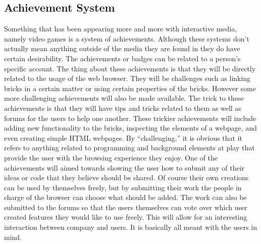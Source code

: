 \documentclass[11pt]{article}
\begin{document}
\subsection{Achievement System}
Something that has been appearing more and more with interactive media, namely video games is a system of achievements. Although these systems don’t actually mean anything outside of the media they are found in they do have certain desirability. The achievements or badges can be related to a person’s specific account. The thing about these achievements is that they will be directly related to the usage of the web browser. They will be challenges such as linking bricks in a certain matter or using certain properties of the bricks. However some more challenging achievements will also be made available. The trick to these achievements is that they will have tips and tricks related to them as well as forums for the users to help one another. These trickier achievements will include adding new functionality to the bricks, inspecting the elements of a webpage, and even creating simple HTML webpages. By “challenging,” it is obvious that it refers to anything related to programming and background elements at play that provide the user with the browsing experience they enjoy. One of the achievements will aimed towards showing the user how to submit any of their ideas or code that they believe should be shared. Of course their own creations can be used by themselves freely, but by submitting their work the people in charge of the browser can choose what should be added. The work can also be submitted to the forums so that the users themselves can vote over which user created features they would like to use freely. This will allow for an interesting interaction between company and users. It is basically all meant with the users in mind.
%
\end{document}
